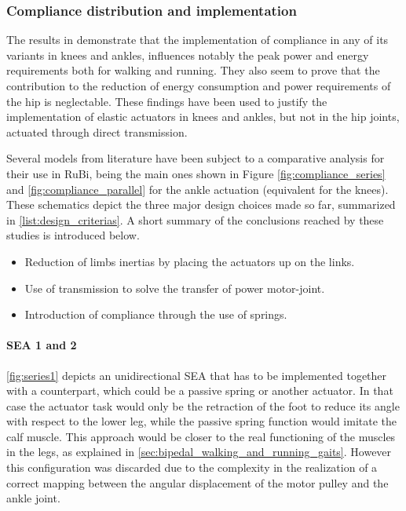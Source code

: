 
\subsubsection{Compliance distribution and implementation} %
\label{ssub:compliance_distribution_and_possible_configurations}
The results in \cite{grimmer} demonstrate that the implementation of compliance in any of its variants in knees and ankles, influences notably the peak power and energy requirements both for walking and running.
They also seem to prove that the contribution to the reduction of energy consumption and power requirements of the hip is neglectable.
These findings have been used to justify the implementation of elastic actuators in knees and ankles, but not in the hip joints, actuated through direct transmission.

Several models from literature have been subject to a comparative analysis for their use in RuBi, being the main ones shown in Figure \ref{fig:compliance_series} and \ref{fig:compliance_parallel} for the ankle actuation (equivalent for the knees).
These schematics depict the three major design choices made so far, summarized in \ref{list:design_criterias}.
A short summary of the conclusions reached by these studies is introduced below.

\begin{itemize}
\label{list:design_criterias}
  \item Reduction of limbs inertias by placing the actuators up on the links.
  \item Use of transmission to solve the transfer of power motor-joint.
  \item Introduction of compliance through the use of springs.
\end{itemize}

\paragraph{SEA 1 and 2} %
\label{par:sea_1_2}
\ref{fig:series1} depicts an unidirectional SEA that has to be implemented together with a counterpart, which could be a passive spring or another actuator.
In that case the actuator task would only be the retraction of the foot to reduce its angle with respect to the lower leg, while the passive spring function would imitate the calf muscle.
This approach would be closer to the real functioning of the muscles in the legs, as explained in \ref{sec:bipedal_walking_and_running_gaits}.
However this configuration was discarded due to the complexity in the realization of a correct mapping between the angular displacement of the motor pulley and the ankle joint.

